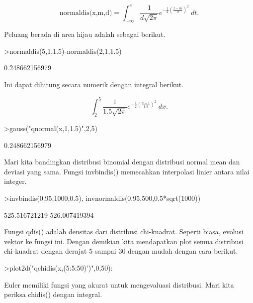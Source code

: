 \documentclass{article}
\begin{document}
\begin{eulernotebook}
\begin{eulercomment}
\begin{eulercomment}
\begin{eulerformula}
\[
\text{normaldis(x,m,d)}=\int_{-\infty}^x \frac{1}{d\sqrt{2\pi}}e^{-\frac{1}{2}(\frac{t-m}{d})^2}\ dt.
\]
\end{eulerformula}
\begin{eulercomment}
Peluang berada di area hijau adalah sebagai berikut.
\end{eulercomment}
\begin{eulerprompt}
>normaldis(5,1,1.5)-normaldis(2,1,1.5)
\end{eulerprompt}
\begin{euleroutput}
  0.248662156979
\end{euleroutput}
\begin{eulercomment}
Ini dapat dihitung secara numerik dengan integral berikut.\\
\end{eulercomment}
\begin{eulerformula}
\[
\int_2^5 \frac{1}{1.5\sqrt{2\pi}}e^{-\frac{1}{2}(\frac{x-1}{1.5})^2}\ dx.
\]
\end{eulerformula}
\begin{eulerprompt}
>gauss("qnormal(x,1,1.5)",2,5)
\end{eulerprompt}
\begin{euleroutput}
  0.248662156979
\end{euleroutput}
\begin{eulercomment}
Mari kita bandingkan distribusi binomial dengan distribusi normal mean
dan deviasi yang sama. Fungsi invbindis() memecahkan interpolasi
linier antara nilai integer.
\end{eulercomment}
\begin{eulerprompt}
>invbindis(0.95,1000,0.5), invnormaldis(0.95,500,0.5*sqrt(1000))
\end{eulerprompt}
\begin{euleroutput}
  525.516721219
  526.007419394
\end{euleroutput}
\begin{eulercomment}
Fungsi qdis() adalah densitas dari distribusi chi-kuadrat. Seperti
biasa, evolusi vektor ke fungsi ini. Dengan demikian kita mendapatkan
plot semua distribusi chi-kuadrat dengan derajat 5 sampai 30 dengan
mudah dengan cara berikut.
\end{eulercomment}
\begin{eulerprompt}
>plot2d("qchidis(x,(5:5:50)')",0,50):
\end{eulerprompt}
\begin{eulercomment}
Euler memiliki fungsi yang akurat untuk mengevaluasi distribusi. Mari
kita periksa chidis() dengan integral.


\end{eulercomment}
\end{eulercomment}
\end{eulercomment}
\end{eulernotebook}
\end{document}

